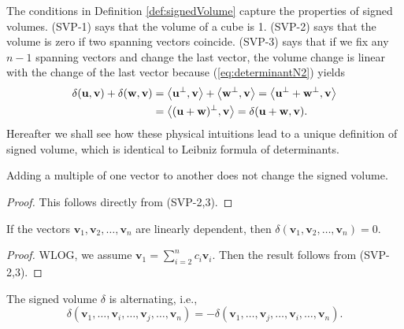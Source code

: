 \begin{rem}
  The conditions in Definition \ref{def:signedVolume} capture
  the properties of signed volumes.
  (SVP-1) says that the volume of a cube is 1.
  (SVP-2) says that the volume is zero
  if two spanning vectors coincide.
  (SVP-3) says that if we fix any $n-1$ spanning vectors
  and change the last vector,
  the volume change is linear with the change of the last vector
  because (\ref{eq:determinantN2}) yields
  \begin{align*}
    \delta(\mathbf{u}, \mathbf{v})
    + \delta(\mathbf{w}, \mathbf{v})
    &= \left\langle \mathbf{u}^{\perp}, \mathbf{v} \right\rangle
      + \left\langle \mathbf{w}^{\perp}, \mathbf{v} \right\rangle
      = \left\langle \mathbf{u}^{\perp}+ {\mathbf{w}}^{\perp}, \mathbf{v} \right\rangle
      \\
    & = \left\langle (\mathbf{u}+\mathbf{w})^{\perp}, \mathbf{v} \right\rangle
      = \delta(\mathbf{u}+\mathbf{w}, \mathbf{v}).
  \end{align*}
  Hereafter we shall see how these physical intuitions
  lead to a unique definition of signed volume,
  which is identical to Leibniz formula of determinants.  
\end{rem}

\begin{lem}
  Adding a multiple of one vector to another does not
  change the signed volume.
\end{lem}
\begin{proof}
  This follows directly from (SVP-2,3).
\end{proof}

\begin{lem}
  If the vectors $\mathbf{v}_1, \mathbf{v}_{2},\ldots,
  \mathbf{v}_{n}$ are linearly dependent,
  then $\delta(\mathbf{v}_1, \mathbf{v}_{2}, \ldots, \mathbf{v}_{n})=0$.
\end{lem}
\begin{proof}
  WLOG, we assume $\mathbf{v}_1=\sum_{i=2}^n c_i \mathbf{v}_i$.
  Then the result follows from (SVP-2,3).
\end{proof}

\begin{lem}
  \label{lem:alternatingSignedVolume}
  The signed volume $\delta$ is alternating, i.e.,
  \begin{equation}
    \label{eq:alternatingSignedVolume}
    \delta(\mathbf{v}_1, \ldots,
    \mathbf{v}_{i},\ldots, \mathbf{v}_{j},
    \ldots, \mathbf{v}_n)
    = - 
    \delta(\mathbf{v}_1, \ldots,
    \mathbf{v}_{j},\ldots, \mathbf{v}_{i},
    \ldots, \mathbf{v}_n).
  \end{equation}
\end{lem}

